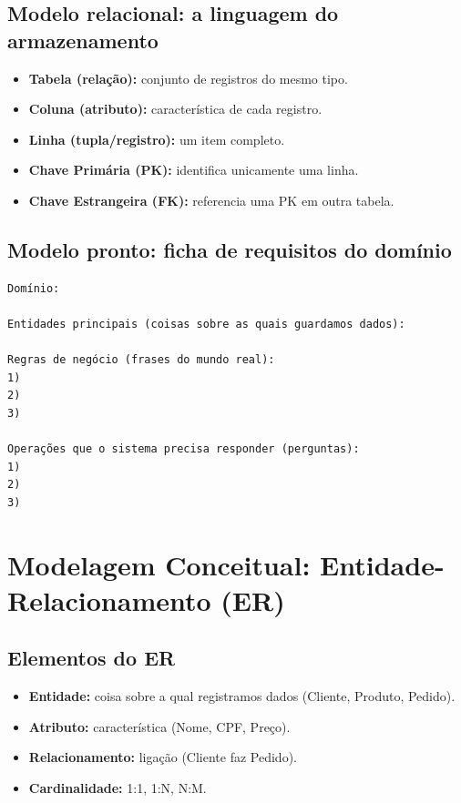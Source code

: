\documentclass[12pt,a4paper]{article}
\begin{document}
\subsection{Modelo relacional: a linguagem do armazenamento}
\begin{itemize}[leftmargin=*,itemsep=0.2em]
  \item \textbf{Tabela (relação):} conjunto de registros do mesmo tipo.
  \item \textbf{Coluna (atributo):} característica de cada registro.
  \item \textbf{Linha (tupla/registro):} um item completo.
  \item \textbf{Chave Primária (PK):} identifica unicamente uma linha.
  \item \textbf{Chave Estrangeira (FK):} referencia uma PK em outra tabela.
\end{itemize}

\subsection{Modelo pronto: ficha de requisitos do domínio}
\begin{lstlisting}[style=text]
Domínio:

Entidades principais (coisas sobre as quais guardamos dados):

Regras de negócio (frases do mundo real):
1)
2)
3)

Operações que o sistema precisa responder (perguntas):
1)
2)
3)
\end{lstlisting}

\section{Modelagem Conceitual: Entidade-Relacionamento (ER)}

\subsection{Elementos do ER}
\begin{itemize}[leftmargin=*,itemsep=0.2em]
  \item \textbf{Entidade:} coisa sobre a qual registramos dados (Cliente, Produto, Pedido).
  \item \textbf{Atributo:} característica (Nome, CPF, Preço).
  \item \textbf{Relacionamento:} ligação (Cliente faz Pedido).
  \item \textbf{Cardinalidade:} 1:1, 1:N, N:M.
\end{itemize}
\end{document}
